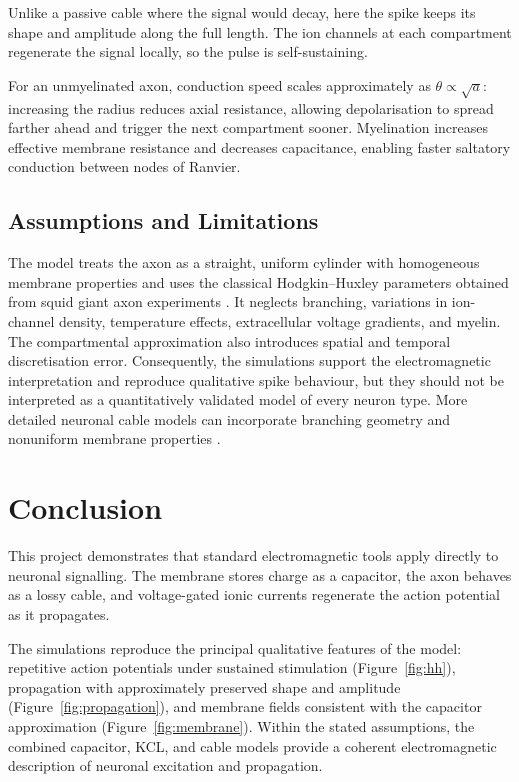 \documentclass[12pt, a4paper]{article}
\begin{document}
Unlike a passive cable where the signal would decay, here the spike
keeps its shape and amplitude along the full length. The ion channels
at each compartment regenerate the signal locally, so the pulse is
self-sustaining.

For an unmyelinated axon, conduction speed scales approximately as
$\theta \propto \sqrt{a}$: increasing the radius reduces axial
resistance, allowing depolarisation to spread farther ahead and
trigger the next compartment sooner. Myelination increases effective
membrane resistance and decreases capacitance, enabling faster
saltatory conduction between nodes of Ranvier.

\subsection{Assumptions and Limitations}

The model treats the axon as a straight, uniform cylinder with
homogeneous membrane properties and uses the classical
Hodgkin--Huxley parameters obtained from squid giant axon experiments
\cite{Hodgkin1952}. It neglects branching, variations in ion-channel
density, temperature effects, extracellular voltage gradients, and
myelin. The compartmental approximation also introduces spatial and
temporal discretisation error. Consequently, the simulations support
the electromagnetic interpretation and reproduce qualitative spike
behaviour, but they should not be interpreted as a quantitatively
validated model of every neuron type. More detailed neuronal cable
models can incorporate branching geometry and nonuniform membrane
properties \cite{Rall1959}.

\section{Conclusion}

This project demonstrates that standard electromagnetic tools apply
directly to neuronal signalling. The membrane stores charge as a
capacitor, the axon behaves as a lossy cable, and voltage-gated ionic
currents regenerate the action potential as it propagates.

The simulations reproduce the principal qualitative features of the
model: repetitive action potentials under sustained stimulation
(Figure~\ref{fig:hh}), propagation with approximately preserved shape
and amplitude (Figure~\ref{fig:propagation}), and membrane fields
consistent with the capacitor approximation
(Figure~\ref{fig:membrane}). Within the stated assumptions, the
combined capacitor, KCL, and cable models provide a coherent
electromagnetic description of neuronal excitation and propagation.

\newpage


\end{document}

